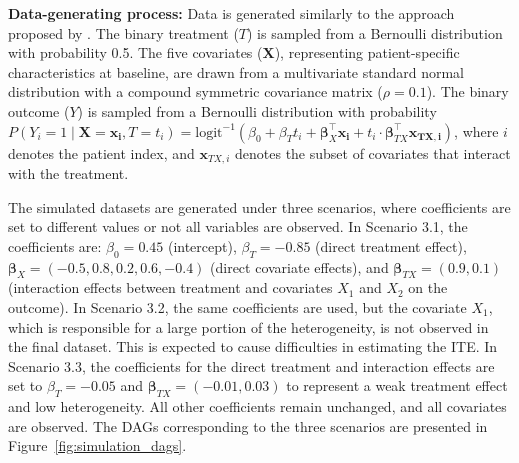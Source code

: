 \medskip

\textbf{Data-generating process:} Data is generated similarly to the approach proposed by \citet{hoogland2021}. The binary treatment ($T$) is sampled from a Bernoulli distribution with probability 0.5. The five covariates ($\mathbf{X}$), representing patient-specific characteristics at baseline, are drawn from a multivariate standard normal distribution with a compound symmetric covariance matrix ($\rho=0.1$). The binary outcome ($Y$) is sampled from a Bernoulli distribution with probability $P(Y_i = 1 \mid  \mathbf{X} = \mathbf{x_i}, T = t_i) = \text{logit}^{-1} \left(\beta_0 + \beta_T t_i + \boldsymbol{\beta}_X^\top \mathbf{x_i} + t_i \cdot \boldsymbol{\beta}_{TX}^\top \mathbf{x_{TX,i}} \right)$, where $i$ denotes the patient index, and $\mathbf{x}_{TX,i}$ denotes the subset of covariates that interact with the treatment.

The simulated datasets are generated under three scenarios, where coefficients are set to different values or not all variables are observed. In Scenario 3.1, the coefficients are: $\beta_0 = 0.45$ (intercept), $\beta_T = -0.85$ (direct treatment effect), $\boldsymbol{\beta}_X = (-0.5, 0.8, 0.2, 0.6, -0.4)$ (direct covariate effects), and $\boldsymbol{\beta}_{TX} = (0.9, 0.1)$ (interaction effects between treatment and covariates $X_1$ and $X_2$ on the outcome). In Scenario 3.2, the same coefficients are used, but the covariate $X_1$, which is responsible for a large portion of the heterogeneity, is not observed in the final dataset. This is expected to cause difficulties in estimating the ITE. In Scenario 3.3, the coefficients for the direct treatment and interaction effects are set to $\beta_T = -0.05$ and $\boldsymbol{\beta}_{TX} = (-0.01, 0.03)$ to represent a weak treatment effect and low heterogeneity. All other coefficients remain unchanged, and all covariates are observed. The DAGs corresponding to the three scenarios are presented in Figure~\ref{fig:simulation_dags}.



